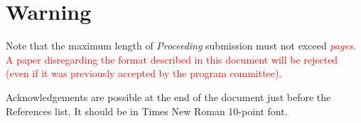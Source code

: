 \documentclass[long, final]{jobim}
\begin{document}
\section{Warning}
Note that the maximum length of \emph{Proceeding} submission must not exceed \textcolor{red}{\emph{\JobimLongPaperMaxPages{} pages}. A paper disregarding the
format described in this document will be rejected (even if it was previously accepted
by the program committee).}

\begin{acknowledgements}
  \label{sec:acknowledgements}

  Acknowledgements are possible at the end of the document just before the References list. It should be in Times New Roman 10-point font.
\end{acknowledgements}



\end{document}
